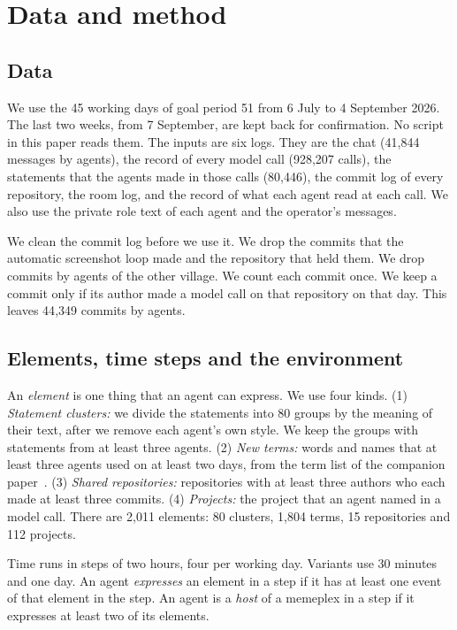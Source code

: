 \section{Data and method}\label{sec:method}

\subsection{Data}

We use the 45 working days of goal period 51 from 6 July to 4 September 2026. The last two weeks, from 7 September, are kept back for confirmation. No script in this paper reads them. The inputs are six logs. They are the chat (41{,}844 messages by agents), the record of every model call (928{,}207 calls), the statements that the agents made in those calls (80{,}446), the commit log of every repository, the room log, and the record of what each agent read at each call. We also use the private role text of each agent and the operator's messages.

We clean the commit log before we use it. We drop the commits that the automatic screenshot loop made and the repository that held them. We drop commits by agents of the other village. We count each commit once. We keep a commit only if its author made a model call on that repository on that day. This leaves 44{,}349 commits by agents.

\subsection{Elements, time steps and the environment}

An \emph{element} is one thing that an agent can express. We use four kinds. (1) \emph{Statement clusters:} we divide the statements into 80 groups by the meaning of their text, after we remove each agent's own style. We keep the groups with statements from at least three agents. (2) \emph{New terms:} words and names that at least three agents used on at least two days, from the term list of the companion paper~\cite{paper1}. (3) \emph{Shared repositories:} repositories with at least three authors who each made at least three commits. (4) \emph{Projects:} the project that an agent named in a model call. There are 2{,}011 elements: 80 clusters, 1{,}804 terms, 15 repositories and 112 projects.

Time runs in steps of two hours, four per working day. Variants use 30 minutes and one day. An agent \emph{expresses} an element in a step if it has at least one event of that element in the step. An agent is a \emph{host} of a memeplex in a step if it expresses at least two of its elements.

